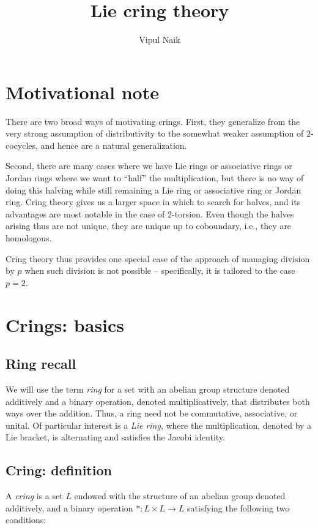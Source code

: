 \documentclass[10pt]{amsart}
\title{Lie cring theory}
\author{Vipul Naik}
\begin{document}
\maketitle

\section*{Motivational note}

There are two broad ways of motivating crings. First, they
generalize from the very strong assumption of distributivity to the
somewhat weaker assumption of $2$-cocycles, and hence are a natural
generalization.

Second, there are many cases where we have Lie rings or associative
rings or Jordan rings where we want to ``half'' the multiplication,
but there is no way of doing this halving while still remaining a Lie
ring or associative ring or Jordan ring. Cring theory gives us a
larger space in which to search for halves, and its advantages are
most notable in the case of $2$-torsion. Even though the halves
arising thus are not unique, they are unique up to coboundary, i.e.,
they are homologous.

Cring theory thus provides one special case of the approach of
managing division by $p$ when such division is not possible --
specifically, it is tailored to the case $p = 2$.
\section{Crings: basics}

\subsection{Ring recall}

We will use the term {\em ring} for a set with an abelian group
structure denoted additively and a binary operation, denoted
multiplicatively, that distributes both ways over the addition. Thus,
a ring need not be commutative, associative, or unital. Of particular
interest is a {\em Lie ring}, where the multiplication, denoted by a
Lie bracket, is alternating and satisfies the Jacobi identity.

\subsection{Cring: definition}

A {\em cring} is a set $L$ endowed with the structure of an abelian
group denoted additively, and a binary operation $*: L \times L \to L$
satisfying the following two conditions:
\end{document}
